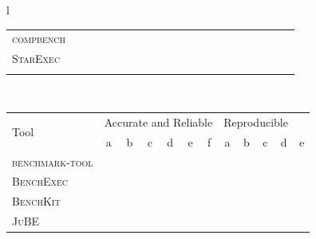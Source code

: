 \begin{table}
\begin{threeparttable}
\begin{adjustbox}{max width=\textwidth}
\begin{tabular}{l}
\begin{tabular}{l | cccccccccc | cccccccccc}
                    \textsc{compbench} &
                        \checkmark & \checkmark & & \checkmark & \checkmark & & \checkmark & \checkmark & \checkmark & &
                        \checkmark & & & & & \checkmark & & \checkmark & \checkmark &\\
                    \textsc{StarExec} &
                        \checkmark & \checkmark & \checkmark & & \checkmark & & \checkmark & & \checkmark & \checkmark &
						\checkmark & \checkmark & \checkmark & \checkmark & & \checkmark & \checkmark & \checkmark & \checkmark & \checkmark\\
					\textbf{\OurBenchmarkingTool} &
						\pmb{\checkmark} & \pmb{\checkmark} & \pmb{\checkmark} & \pmb{\checkmark} & \pmb{\checkmark} & \pmb{\checkmark} & \pmb{\checkmark} &\pmb{\checkmark} & \pmb{\checkmark} & \pmb{\checkmark} &
						\pmb{\checkmark} & \pmb{\checkmark} & \pmb{\checkmark} & \pmb{\checkmark} & & \pmb{\checkmark} & \pmb{\checkmark} & \pmb{\checkmark} & \pmb{\checkmark} & \\
                    \bottomrule
                \end{tabular}\\
                \begin{tabular}{l | cccccc | ccccc}
                    \multirow{2}{*}{Tool} &
                        \multicolumn{6}{c|}{Accurate and Reliable} &
                        \multicolumn{4}{c}{Reproducible}\\
                        & a & b & c & d & e & f &
                        a & b & c & d & e\\
                    \midrule
                    \textsc{benchmark-tool} &
                        & & & \checkmark & &
                        & & \checkmark & & & \\
                    \textsc{BenchExec} &
                        \checkmark & \checkmark & \checkmark & \checkmark & \checkmark & \checkmark &
                        \checkmark & \checkmark & \checkmark & & \checkmark
                        \\
                    \textsc{BenchKit} &
                        & \checkmark & & \checkmark & & \checkmark &
                        & & & & \checkmark  \\
                    \textsc{JuBE} &
                        \textasteriskcentered & \textasteriskcentered & \textasteriskcentered & \textasteriskcentered & \textasteriskcentered & \textasteriskcentered &
                        & \checkmark & \checkmark \\

\end{tabular}
\end{tabular}
\end{adjustbox}
\end{threeparttable}
\end{table}
